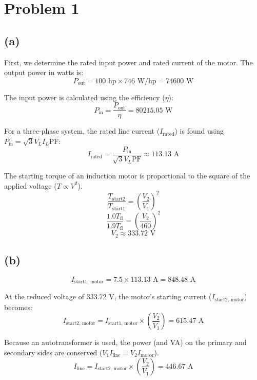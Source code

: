 \documentclass[12pt]{article}
\begin{document}
	
	\newpage
	\pagestyle{fancy}
	\fancyhf{}
	\cfoot{\thepage}


\newpage
\section*{Problem 1}

\subsection*{(a)}
First, we determine the rated input power and rated current of the motor. The output power in watts is:
\[ P_{\text{out}} = 100 \text{ hp} \times 746 \text{ W/hp} = 74 600 \text{ W} \]

The input power is calculated using the efficiency ($\eta$):
\[ P_{\text{in}} = \frac{P_{\text{out}}}{\eta} = 80 215.05 \text{ W} \]

For a three-phase system, the rated line current ($I_{\text{rated}}$) is found using $P_{\text{in}} = \sqrt{3} V_L I_L \text{PF}$:
\[ I_{\text{rated}} = \frac{P_{\text{in}}}{\sqrt{3} V_L \text{PF}}\approx 113.13 \text{ A} \]

The starting torque of an induction motor is proportional to the square of the applied voltage ($T \propto V^2$).
\[ \frac{T_{\text{start2}}}{T_{\text{start1}}} = \left( \frac{V_2}{V_1} \right)^2 \]
\[ \frac{1.0 T_{\text{fl}}}{1.9 T_{\text{fl}}} = \left( \frac{V_2}{460} \right)^2 \]
\[ V_2 \approx 333.72 \text{ V} \]


\vspace{0.5cm}

\subsection*{(b)}


\[ I_{\text{start1, motor}} = 7.5 \times 113.13 \text{ A} = 848.48 \text{ A} \]

At the reduced voltage of $333.72 \text{ V}$, the motor's starting current ($I_{\text{start2, motor}}$) becomes:
\[ I_{\text{start2, motor}} = I_{\text{start1, motor}} \times \left( \frac{V_2}{V_1} \right) = 615.47 \text{ A} \]

Because an autotransformer is used, the power (and VA) on the primary and secondary sides are conserved ($V_1 I_{\text{line}} = V_2 I_{\text{motor}}$).
\[ I_{\text{line}} = I_{\text{start2, motor}} \times \left( \frac{V_2}{V_1} \right) = 446.67 \text{ A} \]
\end{document}

